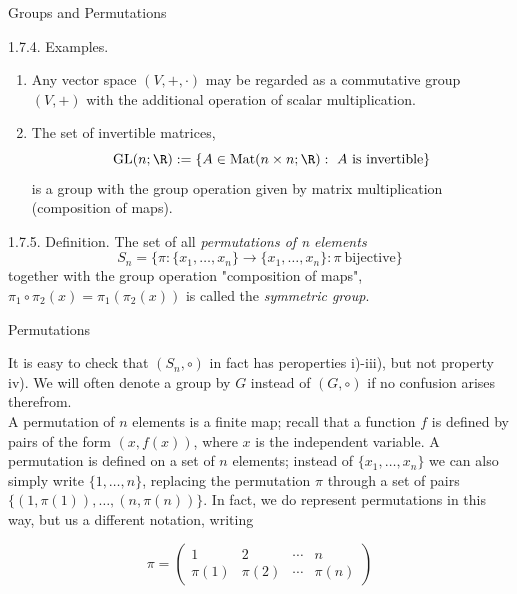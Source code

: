 \documentclass[smaller,hyperref={CJKbookmarks=true}]{beamer}
\begin{document}
\begin{frame}[t,shrink]{Groups and Permutations}
\begin{spacing}{1.1}
\alert{1.7.4. Examples.}
\begin{enumerate}[1.]
  \item Any vector space $(V,+,\cdot)$ may be regarded as a commutative group $(V,+)$ with the additional operation of scalar multiplication.
  \item The set of invertible matrices,
      \[\text{GL}(n;\R):=\{A\in\text{Mat}(n\times n;\R):~A~\text{is invertible}\}\]
      is a group with the group operation given by matrix multiplication (composition of maps).
\end{enumerate}
\alert{1.7.5. Definition.} The set of all \emph{permutations of n elements}
\[S_n=\{\pi:\{x_1,\ldots,x_n\}\to\{x_1,\ldots,x_n\}:\pi~\text{bijective}\}\]
together with the group operation "composition of maps", $\pi_1\circ\pi_2(x)=\pi_1(\pi_2(x))$ is called the \emph{symmetric group}.
\end{spacing}
\end{frame}
\begin{frame}[c]{Permutations}
\begin{spacing}{1.1}
\begin{sloppypar}
It is easy to check that $(S_n,\circ)$ in fact has peroperties i)-iii), but not property iv). We will often denote a group by $G$ instead of $(G,\circ)$ if no confusion arises therefrom.\\[6pt]
A permutation of $n$ elements is a finite map; recall that a function $f$ is defined by pairs of the form $(x,f(x))$, where $x$ is the independent variable. A permutation is defined on a set of $n$ elements; instead of $\{x_1,\ldots,x_n\}$ we can also simply write $\{1,\ldots,n\}$, replacing the permutation $\pi$ through a set of pairs $\{(1,\pi(1)),\ldots,(n,\pi(n))\}$. In fact, we do represent permutations in this way, but us a dif{}ferent notation, writing
\end{sloppypar}
\[\pi=\begin{pmatrix}
1 & 2 & \cdots & n \\
\pi(1) & \pi(2) & \cdots & \pi(n)
\end{pmatrix}\]
\end{spacing}
\end{frame}
\end{document}
